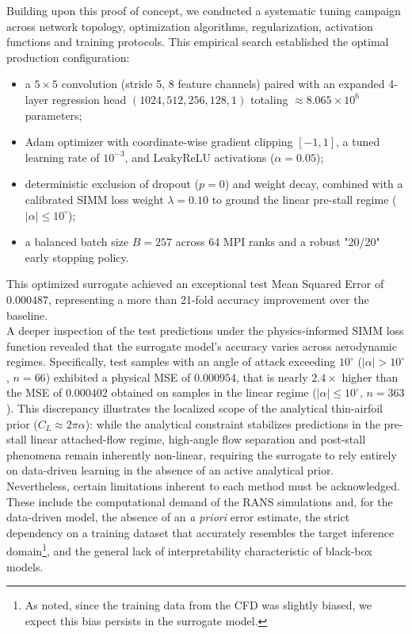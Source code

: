 Building upon this proof of concept, we conducted a systematic tuning campaign across network topology, optimization algorithms, regularization, activation functions and training protocols. This empirical search established the optimal production configuration:
\begin{itemize}
    \item[-] a $5\times 5$ convolution (stride 5, 8 feature channels) paired with an expanded 4-layer regression head $(1024, 512, 256, 128, 1)$ totaling $\approx 8.065\times 10^6$ parameters;
    \item[-] Adam optimizer with coordinate-wise gradient clipping $[-1,1]$, a tuned learning rate of $10^{-3}$, and LeakyReLU activations ($\alpha=0.05$);
    \item[-] deterministic exclusion of dropout ($p=0$) and weight decay, combined with a calibrated SIMM loss weight $\lambda=0.10$ to ground the linear pre-stall regime ($|\alpha|\leq 10^\circ$);
    \item[-] a balanced batch size $B=257$ across 64 MPI ranks and a robust "20/20" early stopping policy.
\end{itemize}
This optimized surrogate achieved an exceptional test Mean Squared Error of $0.000487$, representing a more than 21-fold accuracy improvement over the baseline.\\

A deeper inspection of the test predictions under the physics-informed SIMM loss function revealed that the surrogate model's accuracy varies across aerodynamic regimes. Specifically, test samples with an angle of attack exceeding $10^\circ$ ($|\alpha|>10^\circ$, $n=66$) exhibited a physical MSE of $0.000954$, that is nearly $2.4\times$ higher than the MSE of $0.000402$ obtained on samples in the linear regime ($|\alpha|\leq 10^\circ$, $n=363$). This discrepancy illustrates the localized scope of the analytical thin-airfoil prior ($C_L \approx 2\pi\alpha$): while the analytical constraint stabilizes predictions in the pre-stall linear attached-flow regime, high-angle flow separation and post-stall phenomena remain inherently non-linear, requiring the surrogate to rely entirely on data-driven learning in the absence of an active analytical prior.\\

Nevertheless, certain limitations inherent to each method must be acknowledged. These include the computational demand of the RANS simulations and, for the data-driven model, the absence of an \textit{a priori} error estimate, the strict dependency on a training dataset that accurately resembles the target inference domain\footnote{As noted, since the training data from the CFD was slightly biased, we expect this bias persists in the surrogate model.}, and the general lack of interpretability characteristic of black-box models.\\

